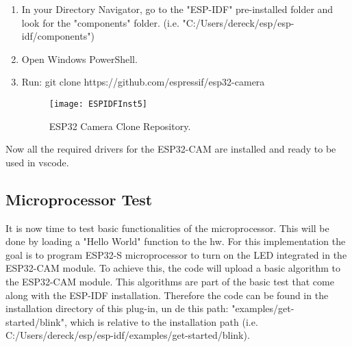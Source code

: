 \begin{enumerate}
	\item In your Directory Navigator, go to the "ESP-IDF" pre-installed folder and look for the "components" folder. (i.e. "C:/Users/dereck/esp/esp-idf/components")
	\item Open Windows PowerShell.
	\item Run: git clone https://github.com/espressif/esp32-camera
	\begin{figure}  [H]
	\begin{center}
		\texttt{[image: ESPIDFInst5]}
		\caption{ESP32 Camera Clone Repository.} 
		\label{fig:ESP32 Camera Clone Repository.}
	\end{center}
	\end{figure}	
\end{enumerate}

Now all the required drivers for the ESP32-CAM are installed and ready to be used in \ac{vscode}.

\subsection{Microprocessor Test}                                                                
It is now time to test basic functionalities of the microprocessor. This will be done by loading a "Hello World" function to the \ac{hw}. For this implementation the goal is to program ESP32-S microprocessor to turn on the LED integrated in the ESP32-CAM module. To achieve this, the code will upload a basic algorithm to the ESP32-CAM module. This algorithms are part of the basic test that come along with the ESP-IDF installation. Therefore the code can be found in the installation directory of this plug-in, un de this path: "examples/get-started/blink", which is relative to the installation path (i.e. C:/Users/dereck/esp/esp-idf/examples/get-started/blink).  \\

